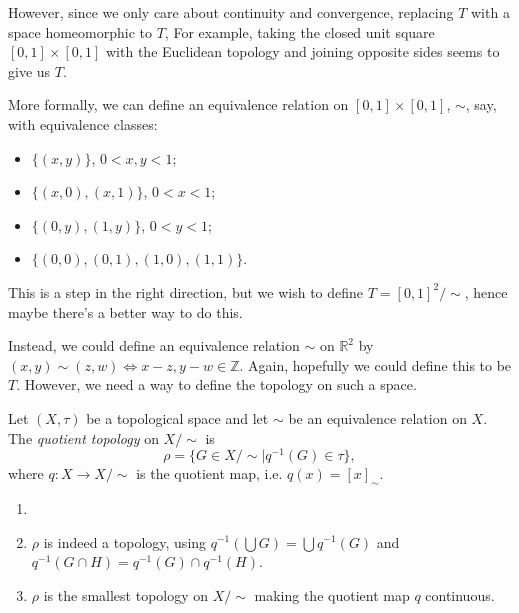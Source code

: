 \documentclass[12pt]{article}
\begin{document}
However, since we only care about continuity and convergence, replacing $T$ with a space homeomorphic to $T$, For example, taking the closed unit square $[0, 1] \times [0, 1]$ with the Euclidean topology and joining opposite sides seems to give us $T$.

More formally, we can define an equivalence relation on $[0, 1] \times [0, 1]$, $\sim$, say, with equivalence classes:
\begin{itemize}
	\item $\{(x, y)\}$, $0 < x, y < 1$;
	\item $\{(x, 0), (x, 1)\}$, $0 < x < 1$;
	\item $\{(0, y), (1, y)\}$, $0 < y < 1$;
	\item $\{(0, 0), (0, 1), (1, 0), (1, 1)\}$.
\end{itemize}
This is a step in the right direction, but we wish to define $T = [0,1]^2/\sim$, hence maybe there's a better way to do this.

Instead, we could define an equivalence relation $\sim$ on $\mathbb{R}^2$ by $(x, y) \sim (z, w) \iff x - z, y - w \in \mathbb{Z}$. Again, hopefully we could define this to be $T$. However, we need a way to define the topology on such a space.

\begin{definition}
	Let $(X, \tau)$ be a topological space and let $\sim$ be an equivalence relation on $X$. The \textit{quotient topology} on $X/\sim$ is
	\[
		\rho = \{G \in X/\sim \mid q^{-1}(G) \in \tau\}
	,\]
	where $q : X \to X/\sim$ is the quotient map, i.e. $q(x) = [x]_{\sim}$.
\end{definition}

\begin{remark}
	\begin{enumerate}[1.]
		\item[]
		\item $\rho$ is indeed a topology, using $q^{-1}(\bigcup G) = \bigcup q^{-1}(G)$ and $q^{-1}(G \cap H) = q^{-1}(G) \cap q^{-1}(H)$.
		\item $\rho$ is the smallest topology on $X/\sim$ making the quotient map $q$ continuous.
	\end{enumerate}
\end{remark}
\end{document}
